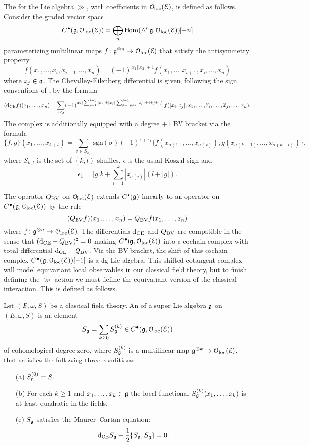 \documentclass[10pt, oneside]{article}
\begin{document}
\begin{definition}
The  for the Lie algebra $\gg$, with coefficients in $\mathcal{O}_{\rm loc}(\mathcal E)$, is defined as follows.  Consider the graded vector space
\[C^\bullet(\mathfrak g, \mathcal{O}_{\rm loc}(\mathcal E)) = \bigoplus_n \operatorname{Hom}(\wedge^n \mathfrak g, \mathcal{O}_{\rm loc}(\mathcal E))[-n]\]
parameterizing multilinear maps $f\colon \mathfrak g^{\otimes n}\rightarrow \mathcal{O}_{\rm loc}(\mathcal E)$ that satisfy the antisymmetry property
\[f(x_1, \dots, x_i, x_{i+1}, \dots, x_n) = (-1)^{|x_1||x_2|+1} f(x_1, \dots, x_{i+1}, x_i, \dots, x_n)\]
where $x_j \in \mathfrak g$.  The Chevalley-Eilenberg differential is given, following the sign conventions of \cite{SafronovCoisoInt}, by the formula
\[({\rm d}_{\mathrm{CE}} f)(x_1, \dots, x_n) = \sum_{i < j}(-1)^{|x_i| \sum_{p=1}^{i-1} |x_p| + |x_j| \sum_{p=1,p\neq i}^{j-1} |x_p| +i+j+|f|} f([x_i, x_j], x_1, \dots, \widehat{x}_i, \dots, \widehat{x}_j, \dots, x_n).\]
The complex is additionally equipped with a degree $+1$ BV bracket via the formula
\[\{f, g\}(x_1, \dots, x_{k+l}) = \sum_{\sigma\in S_{k, l}} \mathrm{sgn}(\sigma) (-1)^{\epsilon+\epsilon_1} \{f(x_{\sigma(1)}, \dots, x_{\sigma(k)}), g(x_{\sigma(k+1)}, \dots, x_{\sigma(k+l)})\},\]
where $S_{k, l}$ is the set of $(k, l)$-shuffles, $\epsilon$ is the usual Koszul sign and
\[\epsilon_1 = |g|k + \sum_{i=1}^k |x_{\sigma(i)}|(l+|g|).\]
\end{definition}

The operator $Q_{\mathrm{BV}}$ on $\mathcal{O}_{\rm loc}(\mathcal E)$ extends $C^\bullet(\mathfrak g)$-linearly to an operator on $C^\bullet(\mathfrak g, \mathcal{O}_{\rm loc}(\mathcal E))$ by the rule
\[
(Q_{\mathrm{BV}} f)(x_1,\ldots, x_n) = Q_{\mathrm{BV}} f(x_1,\ldots, x_n) 
\]
where $f \colon \mathfrak g^{\otimes n} \to \mathcal{O}_{\rm loc}(\mathcal E)$. 
The differentials ${\rm d}_{\mathrm{CE}}$ and $Q_{\mathrm{BV}}$ are compatible in the sense that $({\rm d}_{\mathrm{CE}} + Q_{\mathrm{BV}})^2 = 0$ making $C^\bullet(\mathfrak g, \mathcal{O}_{\rm loc}(\mathcal E))$ into a cochain complex with total differential ${\rm d}_{\mathrm{CE}} + Q_{\mathrm{BV}}$. 
Via the BV bracket, the shift of this cochain complex $C^\bullet(\mathfrak g, \mathcal{O}_{\rm loc}(\mathcal E))[-1]$ is a dg Lie algebra.  This shifted cotangent complex will model equivariant local observables in our classical field theory, but to finish defining the $\gg$ action we must define the equivariant version of the classical interaction.  This is defined as follows.

\begin{definition}
\label{infinitesimal_action_def}
Let $(E, \omega, S)$ be a classical field theory. An  of a super Lie algebra $\mathfrak g$ on $(E, \omega, S)$ is an element 
\[S_\mathfrak g = \sum_{k\geq 0} S_{\mathfrak g}^{(k)}\in C^\bullet(\mathfrak g, \mathcal{O}_{\rm loc}(\mathcal E))\]
of cohomological degree zero, where $S_\mathfrak g^{(k)}$ is a multilinear map $\mathfrak g^{\otimes k} \to \mathcal{O}_{\rm loc}(\mathcal E)$, that satisfies the following three conditions:
\begin{itemize}
\item[(a)] $S_\mathfrak g^{(0)} = S$.
\item[(b)] For each $k \geq 1$ and $x_1, \ldots, x_k \in \mathfrak g$ the local functional $S^{(k)}_\mathfrak g (x_1,\ldots, x_k)$ is at least quadratic in the fields.
\item[(c)] $S_\mathfrak g$ satisfies the Maurer--Cartan equation:
\[{\rm d}_{\mathrm{CE}} S_\mathfrak g + \frac{1}{2} \{S_\mathfrak g, S_\mathfrak g\} = 0.\]
\end{itemize}
\end{definition}
\end{document}
